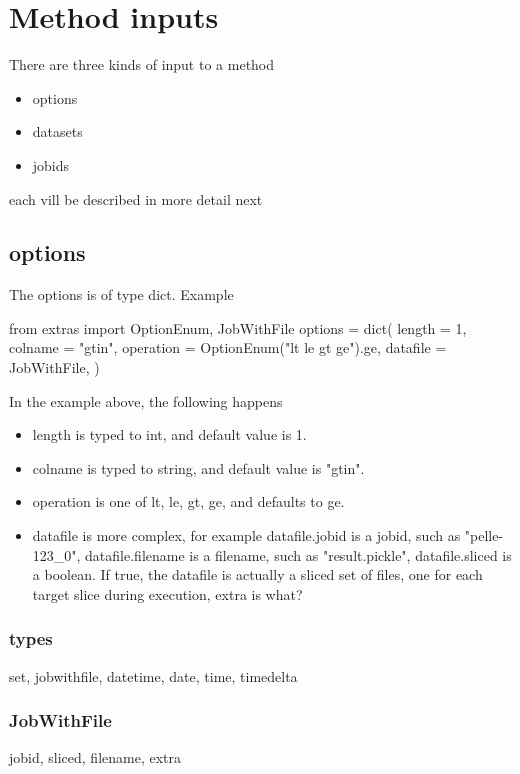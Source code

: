 \section{Method inputs}

There are three kinds of input to a method
\begin{itemize}
\item options
\item datasets
\item jobids
\end{itemize}

each vill be described in more detail next

\subsection*{options}
The options is of type dict.  Example

\begin{python}
from extras import OptionEnum, JobWithFile
options = dict(
  length = 1,
  colname = "gtin",
  operation = OptionEnum("lt le gt ge").ge,
  datafile = JobWithFile,
)
\end{python}
In the example above, the following happens
\begin{itemize}
\item length is typed to int, and default value is 1.
\item colname is typed to string, and default value is "gtin".
\item operation is one of lt, le, gt, ge, and defaults to ge.
\item datafile is more complex, for example datafile.jobid is a jobid,
  such as "pelle-123\_0", datafile.filename is a filename, such as
  "result.pickle", datafile.sliced is a boolean.  If true, the
  datafile is actually a sliced set of files, one for each target
  slice during execution, extra is what?
\end{itemize}

\subsubsection{types}
set, jobwithfile, datetime, date, time, timedelta




\subsubsection{JobWithFile}

jobid, sliced, filename, extra


